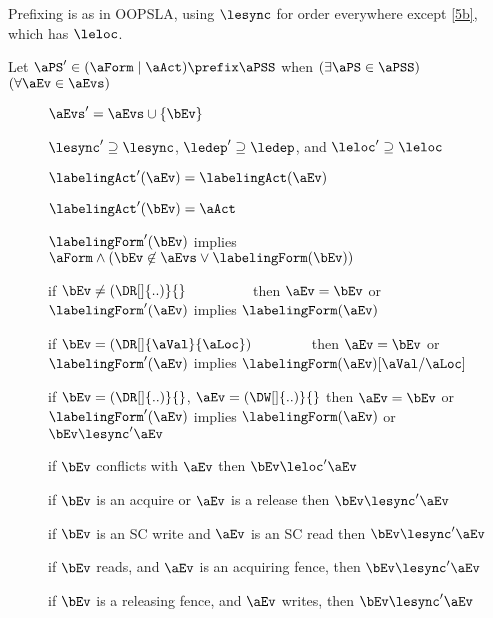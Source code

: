Prefixing is as in OOPSLA, using $\lesync$ for order everywhere except
\ref{5b}, which has $\leloc$.
\begin{definition}
  Let $\aPS'\in(\aForm \mid \aAct) \prefix \aPSS$ when
  $(\exists\aPS\in\aPSS)$ $(\forall\aEv\in\aEvs)$
  \begin{description}
  \item[{}] $\aEvs' = \aEvs \cup \{\bEv\}$
  \item[{}] ${\lesync'}\supseteq{\lesync}$,
    ${\ledep'}\supseteq{\ledep}$, and ${\leloc'}\supseteq{\leloc}$
  \item[{}]%
    $\labelingAct'(\aEv) = \labelingAct(\aEv)$
  \item[{}] $\labelingAct'(\bEv) = \aAct$
  \item[{}]%
    $\labelingForm'(\bEv)$ implies
    $\aForm\land(\bEv\not\in\aEvs\lor\labelingForm(\bEv))$
  \item[{}] if $\bEv\neq(\DR[]{..)}{}\mkern79mu$
    then $\aEv=\bEv$ or $\labelingForm'(\aEv)$ implies $\labelingForm(\aEv)$
  \item[{}] if
    $\bEv=(\DR[]{\aVal}{\aLoc})\mkern70mu$ then $\aEv=\bEv$ or
    $\labelingForm'(\aEv)$ implies $\labelingForm(\aEv)[\aVal/\aLoc]$
  \item[{}]%
    if $\bEv=(\DR[]{..)}{}$, $\aEv=(\DW[]{..)}{}$ then $\aEv=\bEv$ or
    $\labelingForm'(\aEv)$ implies $\labelingForm(\aEv)$ or $\bEv\lesync'\aEv$
  \item[{}] if $\bEv$ conflicts with
    $\aEv$ %
    then $\bEv\leloc'\aEv$
  \item[{}] if $\bEv$ is an acquire or $\aEv$ is
    a release then $\bEv \lesync' \aEv$
  \item[{}] if $\bEv$ is an SC write and $\aEv$
    is an SC read then $\bEv \lesync' \aEv$
  \item[{}] if $\bEv$ reads, and $\aEv$ is an
    acquiring fence, then
    $\bEv \lesync' \aEv$
  \item[{}] if $\bEv$ is a releasing fence,
    and $\aEv$ writes, then
    $\bEv \lesync' \aEv$
  \end{description}
\end{definition}

